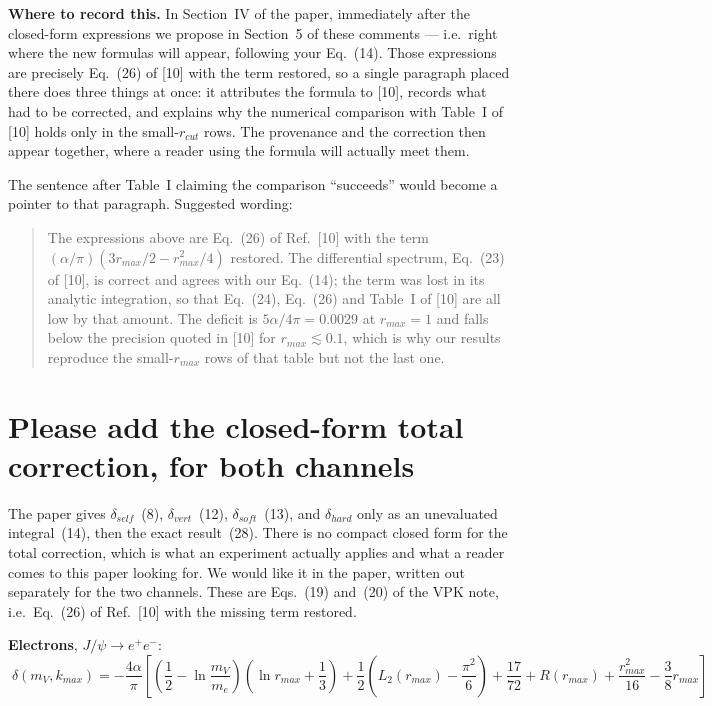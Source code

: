 \documentclass[11pt]{article}
\begin{document}
\textbf{Where to record this.} In Section~IV of the paper, immediately after the
closed-form expressions we propose in Section~5 of these comments --- i.e.\ right
where the new formulas will appear, following your Eq.~(14). Those expressions
are precisely Eq.~(26) of [10] with the term restored, so a single paragraph
placed there does three things at once: it attributes the formula to [10],
records what had to be corrected, and explains why the numerical comparison with
Table~I of [10] holds only in the small-$r_{cut}$ rows. The provenance and the
correction then appear together, where a reader using the formula will actually
meet them.

The sentence after Table~I claiming the comparison ``succeeds'' would become a
pointer to that paragraph. Suggested wording:

\begin{quote}
The expressions above are Eq.~(26) of Ref.~[10] with the term
$(\alpha/\pi)(3r_{max}/2-r_{max}^{2}/4)$ restored. The differential spectrum,
Eq.~(23) of [10], is correct and agrees with our Eq.~(14); the term was lost in
its analytic integration, so that Eq.~(24), Eq.~(26) and Table~I of [10] are all
low by that amount. The deficit is $5\alpha/4\pi=0.0029$ at $r_{max}=1$ and falls
below the precision quoted in [10] for $r_{max}\lesssim0.1$, which is why our
results reproduce the small-$r_{max}$ rows of that table but not the last one.
\end{quote}

\section{Please add the closed-form total correction, for both channels}

The paper gives $\delta_{self}$~(8), $\delta_{vert}$~(12), $\delta_{soft}$~(13),
and $\delta_{hard}$ only as an unevaluated integral~(14), then the exact
result~(28). There is no compact closed form for the total correction, which is
what an experiment actually applies and what a reader comes to this paper
looking for. We would like it in the paper, written out separately for the two
channels. These are Eqs.~(19) and~(20) of the VPK note, i.e.\ Eq.~(26) of
Ref.~[10] with the missing term restored.

\medskip
\textbf{Electrons}, $J/\psi\to e^+e^-$:
\begin{equation*}
\boxed{\;
\delta(m_V,k_{max})=-\frac{4\alpha}{\pi}
\left[
\left(\frac12-\ln\frac{m_V}{m_e}\right)\left(\ln r_{max}+\frac13\right)
+\frac12\left(L_2(r_{max})-\frac{\pi^{2}}{6}\right)
+\frac{17}{72}+R(r_{max})
+\frac{r_{max}^{2}}{16}-\frac{3}{8}r_{max}
\right]\;}
\end{equation*}
\end{document}
